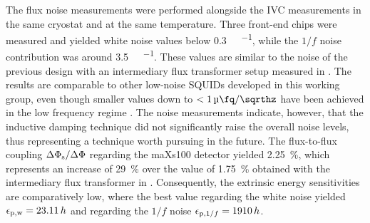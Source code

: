 The flux noise measurements were performed alongside the IVC measurements in the same cryostat and at the same temperature. Three front-end chips were measured and yielded white noise values below \qty{0.3}{\micro\fq\per\sqrthz}, while the $1/f$ noise contribution was around \qty{3.5}{\micro\fq\per\sqrthz}. 
These values are similar to the noise of the previous design with an intermediary flux transformer setup measured in \cite{Bauer2022}. The results are comparable to other low-noise SQUIDs developed in this working group, even though smaller values down to $<\qty{1}{\micro\fq\per\sqrthz}$ have been achieved in the low frequency regime \cite{Ferring2015}. The noise measurements indicate, however, that the inductive damping technique did not significantly raise the overall noise levels, thus representing a technique worth pursuing in the future. The flux-to-flux coupling $\Delta\Phi_{\rm s}/\Delta\Phi$ regarding the maXs100 detector yielded \qty{2.25}{\percent}, which represents an increase of \qty{29}{\percent} over the value of \qty{1.75}{\percent} obtained with the intermediary flux transformer in \cite{Bauer2022}. Consequently, the extrinsic energy sensitivities are comparatively low, where the best value regarding the white noise yielded $\epsilon_{\rm p,w}=23.11\, h$ and regarding the $1/f$ noise $\epsilon_{{\rm p}, 1/f}=1910\, h$.


